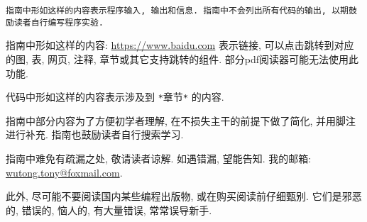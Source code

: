 
\begin{lstlisting}
指南中形如这样的内容表示程序输入, 输出和信息. 指南中不会列出所有代码的输出, 以期鼓励读者自行编写程序实验.
\end{lstlisting}

    \vspace*{5pt}
    指南中形如这样的内容: \href{https://www.baidu.com}{https://www.baidu.com} 表示链接, 可以点击跳转到对应的图, 表, 网页, 注释, 章节或其它支持跳转的组件. 部分pdf阅读器可能无法使用此功能.

    \begin{mdframed}[linecolor=darkgray]
        代码中形如这样的内容表示涉及到 \texttt{*}章节\texttt{*} 的内容.
    \end{mdframed}

    指南中部分内容为了方便初学者理解, 在不损失主干的前提下做了简化, 并用脚注进行补充. 指南也鼓励读者自行搜索学习.

    指南中难免有疏漏之处, 敬请读者谅解. 如遇错漏, 望能告知. 我的邮箱: \mbox{\href{mailto: wutong.tony@foxmail.com}{wutong.tony@foxmail.com}}.

    此外, 尽可能不要阅读国内某些编程出版物, 或在购买阅读前仔细甄别. 它们是邪恶的, 错误的, 恼人的, 有大量错误, 常常误导新手.